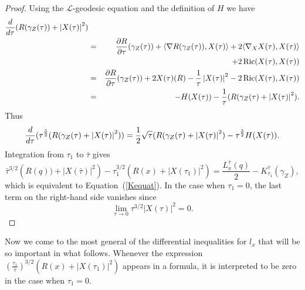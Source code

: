 \begin{proof}
\sketch
{}
Using the ${\mathcal L}$-geodesic equation and the definition of $H$ we have
\begin{eqnarray*}
\frac{d}{d\tau}(R(\gamma_Z(\tau))+ \left\vert X(\tau)\right\vert^{2}) \\ &
= & \frac{\partial R}{\partial\tau}(\gamma_Z(\tau)) + \langle \nabla
R(\gamma_Z(\tau)),
X(\tau)\rangle + 2\langle \nabla_{X}X(\tau),X(\tau)\rangle \\
& & + 2\operatorname{Ric}(X(\tau),X(\tau))
\\&= & \frac{\partial R}{\partial\tau}(\gamma_Z(\tau)) + 2X(\tau)(R) - \frac{1}{\tau}\left\vert X(\tau)\right\vert^{2} -
2\operatorname{Ric}(X(\tau),X(\tau)) \\&= &-H(X(\tau))
-\frac{1}{\tau}(R(\gamma_Z(\tau)+ \left\vert X(\tau)\right\vert^{2}).
\end{eqnarray*}
Thus
$$\frac{d}{d\tau}(\tau^{\frac{3}{2}}(R(\gamma_Z(\tau)+\left\vert X(\tau)\right\vert^{2}) )=
\frac{1}{2}\sqrt{\tau}(R(\gamma_Z(\tau)+\left\vert X(\tau)\right\vert^{2}) -
\tau^{\frac{3}{2}}H(X(\tau)).$$ Integration from $\tau_1$ to $\bar\tau$ gives
$$\bar\tau^{3/2}\left(R(q))+|X(\bar\tau)|^2\right)-\tau_1^{3/2}(R(x)+|X(\tau_1)|^2)
=\frac{L_x^{\bar\tau}(q)}{2}-K_{\tau_1}^{\bar\tau}(\gamma_Z),$$
which is equivalent to Equation~(\ref{Kequat}). In the case when
$\tau_1=0$, the last term on the right-hand side vanishes since
$$\lim_{\tau\rightarrow 0}\tau^{3/2}|X(\tau)|^2=0.$$
\end{proof}



Now we come to the most general of the differential inequalities for
$l_x$ that will be so important in what follows. Whenever the
expression
$\left(\frac{\tau_1}{\bar\tau}\right)^{3/2}\left(R(x)+|X(\tau_1)|^2\right)$
appears in a formula, it is interpreted to be zero in the case when
$\tau_1=0$.


